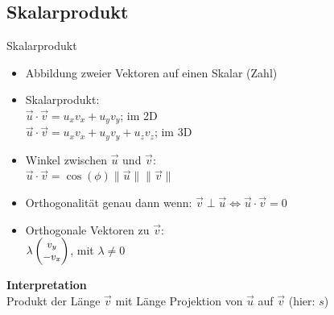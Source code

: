 \documentclass[10pt,aspectratio=169]{beamer}
\begin{document}
  \subsection{Skalarprodukt}
  \begin{frame}{Skalarprodukt}
    \begin{minipage}{9cm}
      \begin{itemize}
        \item Abbildung zweier Vektoren auf einen Skalar (Zahl)
        \item Skalarprodukt:\\
        $\vec{u}\cdot\vec{v} = u_xv_x + u_yv_y$; im 2D\\
        $\vec{u}\cdot\vec{v} = u_xv_x + u_yv_y + u_zv_z$; im 3D\\
        \item Winkel zwischen $\vec{u}$ und $\vec{v}$:\\
        \hspace{0.7cm}$\vec{u} \cdot \vec{v} = \cos(\phi)\|\vec{u}\|\|\vec{v}\|$
        \item Orthogonalität genau dann wenn:
        \hspace{0.7cm}$\vec{v} \perp \vec{u} \Leftrightarrow \vec{u} \cdot \vec{v} = 0$
        \item Orthogonale Vektoren zu $\vec{v}$:\\
        \vspace{0.1cm}\hspace{0.7cm}$\lambda \small\begin{pmatrix}v_y\\ -v_x\end{pmatrix}$, \small mit $\lambda \neq 0$
      \end{itemize}
    \end{minipage}
    \begin{minipage}{4cm}
      \textbf{Interpretation}\\
      \footnotesize Produkt der Länge $\vec{v}$ mit Länge Projektion von $\vec{u}$ auf $\vec{v}$ (hier: $s$)\\
      \vspace{0.1cm}
    \end{minipage}
  \end{frame}
\end{document}
